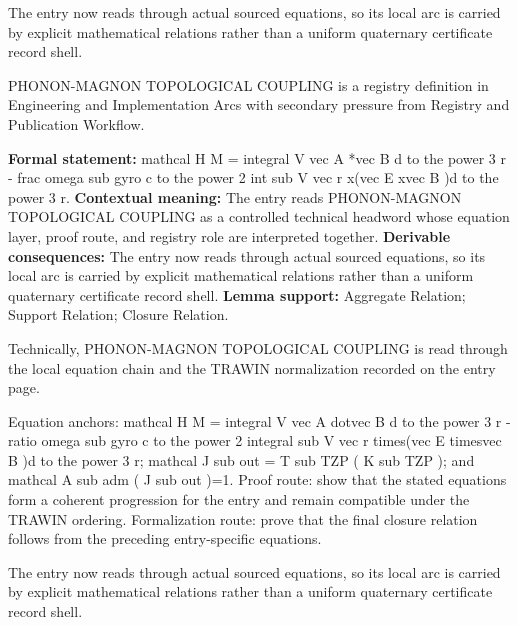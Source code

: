 The entry now reads through actual sourced equations, so its local arc is carried by explicit mathematical relations rather than a uniform quaternary certificate record shell.
\clearpage


\begingroup\small
{}
PHONON-MAGNON TOPOLOGICAL COUPLING is a registry definition in Engineering and Implementation Arcs with secondary pressure from Registry and Publication Workflow.

\begingroup\footnotesize\setlength{\emergencystretch}{3em}\sloppy
\textbf{Formal statement:} mathcal H M = integral V vec A *vec B d to the power 3 r - frac omega sub gyro c to the power 2 int sub V vec r x(vec E xvec B )d to the power 3 r. \textbf{Contextual meaning:} The entry reads PHONON-MAGNON TOPOLOGICAL COUPLING as a controlled technical headword whose equation layer, proof route, and registry role are interpreted together. \textbf{Derivable consequences:} The entry now reads through actual sourced equations, so its local arc is carried by explicit mathematical relations rather than a uniform quaternary certificate record shell. \textbf{Lemma support:} Aggregate Relation; Support Relation; Closure Relation.\par
\endgroup

Technically, PHONON-MAGNON TOPOLOGICAL COUPLING is read through the local equation chain and the TRAWIN normalization recorded on the entry page.

Equation anchors: mathcal H M = integral V vec A dotvec B d to the power 3 r - ratio omega sub gyro c to the power 2 integral sub V vec r times(vec E timesvec B )d to the power 3 r; mathcal J sub out = T sub TZP ( K sub TZP ); and mathcal A sub adm ( J sub out )=1. Proof route: show that the stated equations form a coherent progression for the entry and remain compatible under the TRAWIN ordering. Formalization route: prove that the final closure relation follows from the preceding entry-specific equations.

The entry now reads through actual sourced equations, so its local arc is carried by explicit mathematical relations rather than a uniform quaternary certificate record shell.
\endgroup

